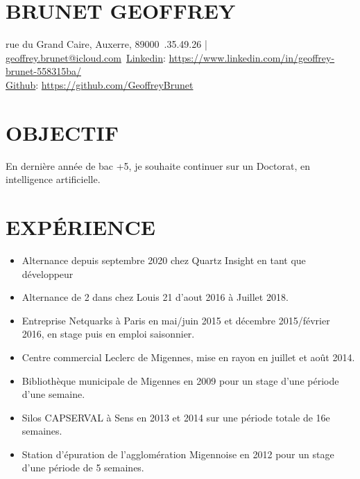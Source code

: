 \documentclass[a4paper,twoside]{article}
\begin{document}
\begin{multicols}{2}

    \section*{BRUNET GEOFFREY}

     rue du Grand Caire, Auxerre, 89000\ .35.49.26 | \href{mailto:geoffrey-brunet89@outlook.fr}{geoffrey.brunet@icloud.com}\
    \href{https://www.linkedin.com/in/geoffrey-brunet-558315ba/}{Linkedin}: \url{https://www.linkedin.com/in/geoffrey-brunet-558315ba/}\\
    \href{https://github.com/GeoffreyBrunet}{Github}: \url{https://github.com/GeoffreyBrunet}

    \section*{OBJECTIF}

    \noindent En dernière année de bac +5, je souhaite continuer sur un Doctorat, en intelligence artificielle.

    \section*{EXPÉRIENCE}

    \begin{itemize}
        \item Alternance depuis septembre 2020 chez Quartz Insight en tant que développeur
        \item Alternance de 2 dans chez Louis 21 d’aout 2016 à Juillet 2018.
        \item Entreprise Netquarks à Paris en mai/juin 2015 et décembre 2015/février 2016, en stage puis en emploi saisonnier.
        \item Centre commercial Leclerc de Migennes, mise en rayon en juillet et août 2014.
        \item Bibliothèque municipale de Migennes en 2009 pour un stage d’une période d’une semaine.
        \item Silos CAPSERVAL à Sens en 2013 et 2014 sur une période totale de 16e semaines.
        \item Station d’épuration de l’agglomération Migennoise en 2012 pour un stage d’une période de 5 semaines.
    \end{itemize}


\end{multicols}
\end{document}

